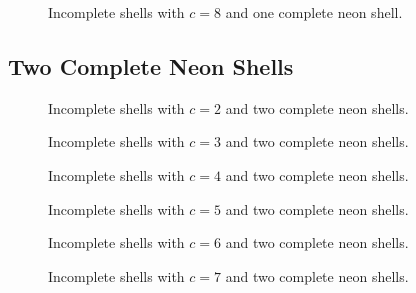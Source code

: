 \begin{figure}[h]
\begin{minipage}{0.48\textwidth}
    \centering
    
    \caption{Incomplete shells with $c=8$ and one complete neon shell.}
    \label{incompl01-core08}
\end{minipage}
\hfill
\begin{minipage}{0.48\textwidth}
    \centering
\end{minipage}
\end{figure}

\vfill
\clearpage
\pagebreak


\subsection{Two Complete Neon Shells}
\begin{figure}[h]
\begin{minipage}{0.48\textwidth}
    \centering
    
    \caption{Incomplete shells with $c=2$ and two complete neon shells.}
    \label{incompl01-core02-core2neon}
\end{minipage}
\hfill
\begin{minipage}{0.48\textwidth}
    \centering
    
    \caption{Incomplete shells with $c=3$ and two complete neon shells.}
    \label{incompl01-core03-core2neon}
\end{minipage}
\end{figure}

\begin{figure}[h]
\begin{minipage}{0.48\textwidth}
    \centering
    
    \caption{Incomplete shells with $c=4$ and two complete neon shells.}
    \label{incompl01-core04-core2neon}
\end{minipage}
\hfill
\begin{minipage}{0.48\textwidth}
    \centering
    
    \caption{Incomplete shells with $c=5$ and two complete neon shells.}
    \label{incompl01-core05-core2neon}
\end{minipage}
\end{figure}

\vspace{10cm}

\begin{figure}[h]
\begin{minipage}{0.48\textwidth}
    \centering
    
    \caption{Incomplete shells with $c=6$ and two complete neon shells.}
    \label{incompl01-core06-core2neon}
\end{minipage}
\hfill
\begin{minipage}{0.48\textwidth}
    \centering
    
    \caption{Incomplete shells with $c=7$ and two complete neon shells.}
    \label{incompl01-core07-core2neon}
\end{minipage}
\end{figure}

